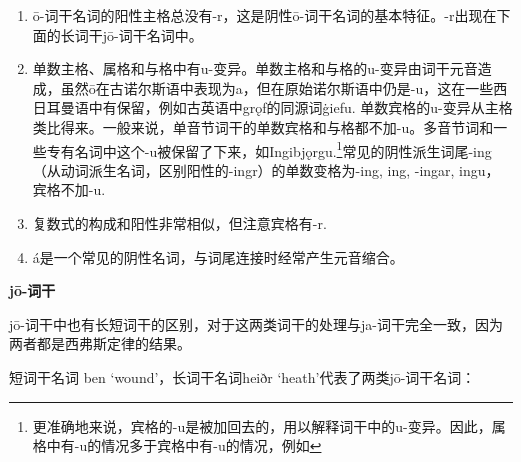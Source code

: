 \begin{enumerate}
  \def\labelenumi{\arabic{enumi})}
  \item
        ō-词干名词的阳性主格总没有-r，这是阴性ō-词干名词的基本特征。-r出现在下面的长词干jō-词干名词中。
  \item
        单数主格、属格和与格中有u-变异。单数主格和与格的u-变异由词干元音造成，虽然ō在古诺尔斯语中表现为a，但在原始诺尔斯语中仍是-u，这在一些西日耳曼语中有保留，例如古英语中grǫf的同源词ġiefu.
        单数宾格的u-变异从主格类比得来。一般来说，单音节词干的单数宾格和与格都不加-u。多音节词和一些专有名词中这个-u被保留了下来，如Ingibjǫrgu.\footnote{更准确地来说，宾格的-u是被加回去的，用以解释词干中的u-变异。因此，属格中有-u的情况多于宾格中有-u的情况，例如}常见的阴性派生词尾-ing（从动词派生名词，区别阳性的-ingr）的单数变格为-ing,
        ing, -ingar, ingu，宾格不加-u.
  \item
        复数式的构成和阳性非常相似，但注意宾格有-r.
  \item
        á是一个常见的阴性名词，与词尾连接时经常产生元音缩合。
\end{enumerate}

\textbf{jō-词干}

jō-词干中也有长短词干的区别，对于这两类词干的处理与ja-词干完全一致，因为两者都是西弗斯定律的结果。

短词干名词 ben `wound'，长词干名词heiðr `heath'代表了两类jō-词干名词：

